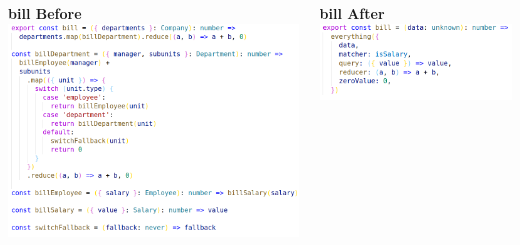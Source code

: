 \documentclass[14pt]{beamer}
\begin{document}
\begin{frame}
\begin{columns}
\begin{column}{.5\textwidth}
    \end{column}
  \end{columns}
\end{frame}

\begin{frame}
  \begin{columns}
    \begin{column}{.5\textwidth}
      \vspace{1em}
      \textbf{bill Before}
      \includegraphics[height=0.7\textheight,width=\textwidth,keepaspectratio]{graphics/bill-naive-ts.png}
    \end{column}
    \begin{column}{.5\textwidth}
      \vspace{1em}
      \textbf{bill After}
      \includegraphics[height=0.7\textheight,width=\textwidth,keepaspectratio]{graphics/bill-ts.png}
    \end{column}
  \end{columns}
\end{frame}
\end{document}
